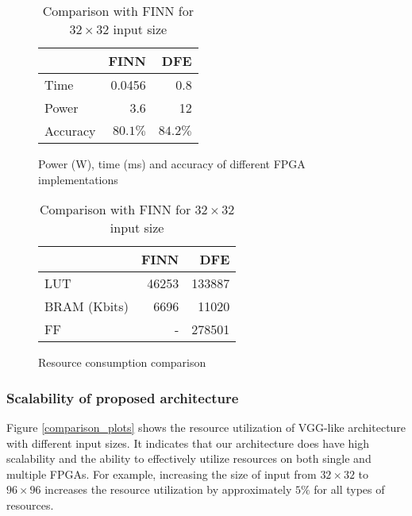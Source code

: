 \documentclass[conference]{IEEEtran}
\newcommand{\ra}[1]{\renewcommand{\arraystretch}{#1}}
\begin{document}
	\begin{table}
		\centering
		\ra{1.3}
		
		\begin{subfigure}{0.45\linewidth}
			
			\begin{adjustbox}{width=\linewidth}
				\begin{tabular}{@{}lrr@{}} \toprule
					&FINN &DFE  \\  \midrule
					Time &0.0456 &0.8 \\
					Power &3.6  &12 \\
					Accuracy  &$80.1\%$  &$84.2\%$ \\  
					\bottomrule
				\end{tabular}
			\end{adjustbox}
			\caption{ Power (W), time (ms) and accuracy of different FPGA implementations}
			\label{FINN_compare_time}
		\end{subfigure}
		\hspace*{\fill} %
		\begin{subfigure}{0.45\linewidth}
			
			\begin{adjustbox}{width=\linewidth}
				\begin{tabular}{@{}lrr@{}} \toprule
					&FINN&DFE\\ \midrule
					LUT&46253&133887\\
					BRAM (Kbits)&6696&11020\\
					FF&-&278501\\
					\bottomrule
				\end{tabular}
			\end{adjustbox}
			\caption{Resource consumption comparison}
			\label{FINN_compare}
		\end{subfigure}
		\vspace{-.5em}
		\caption{Comparison with FINN for $32\times 32$ input size}
		\label{FINN_compare_res}
		\vspace{-.5em}
	\end{table}
	
	\subsubsection{Scalability of proposed architecture}
	\label{Scalability}
	Figure \ref{comparison_plots} shows the resource utilization of VGG-like architecture with different input sizes. It indicates that our architecture does have high scalability and the ability to effectively utilize resources on both single and multiple FPGAs. For example, increasing the size of input from $32\times32$ to $96\times96$ increases the resource utilization by approximately $5\%$ for all types of resources.
	
\end{document}
